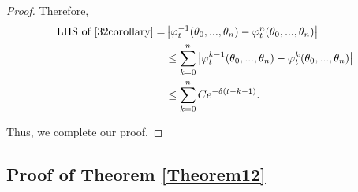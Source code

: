 \documentclass[12pt,oneside,english]{amsart}
\theoremstyle{plain}
\theoremstyle{definition}
\numberwithin{equation}{section}
\begin{document}
\begin{proof}
\begin{comment}
Hence, for any $k\in\{0,...,\lfloor t\rfloor\}$, on the event $\mathcal{A}_{t-k-1}(\epsilon_0)\cap\mathcal{B}_{t-k-1}\cap\mathcal{C}_{t-k-1}$, we get
\begin{align*}
   &\left|\mathbb{\tilde{P}}_{\mu}\left(e^{i\theta \gamma_{t,k}}|\mathscr{F}_{t-k-1}\right)-e^{e^{\alpha}m_k[\theta f]}\right|\\
   &\leq \left|\langle U_1(\tilde{\theta}_{t,k}T_k^{\alpha}f)-\tilde{U}_1(\tilde{\theta}_{t,k}T_k^{\alpha}f), X_{t-k-1}\rangle\right|
   +\left|\langle Z_1(\tilde{\theta}_{t,k}T_k^{\alpha}f),X_{t-k-1}\rangle-e^{\alpha}m_k[\theta f]\right|\\
   &\leq \frac{C}{\mathbb{P}_{\mu}(D^c)}(|\Theta|^{1+2\beta}+|\Theta|^{1+\beta}) e^{-\min\{\frac{\alpha\beta}{4(1+\beta)},\frac{p}{4}\}(t-k-1)}.
\end{align*}
On the event $(\mathcal{A}_{t-k-1}(\epsilon_0)\cap\mathcal{B}_{t-k-1}\cap\mathcal{C}_{t-k-1})^c$, we get
\begin{align*}
    &\left|\mathbb{\tilde{P}}_{\mu}\left(e^{i\theta \gamma_{t,k}}|\mathscr{F}_{t-k-1}\right)-e^{e^{\alpha}m_k[\theta f]}\right|\\
    &\leq 2(\mathbb{\tilde{P}}_{\mu}(\mathcal{A}^c_{t-k-1}(\epsilon_0))+\mathbb{\tilde{P}}_{\mu}(\mathcal{B}^c_{t-k-1})+\mathbb{\tilde{P}}_{\mu}(\mathcal{C}^c_{t-k-1}))\\
    &\leq 6e^{-\min\{\delta_1,\frac{\alpha\beta}{2(1+\beta)},\frac{p}{4}\}(t-k-1)}.
\end{align*}
\end{comment}
Therefore, 
\begin{align}
    \text{LHS of \eqref{32corollary}}= &\left|\varphi^{-1}_t(\theta_0,...,\theta_n)-\varphi^{n}_t(\theta_0,...,\theta_n)\right|
    \\&\leq\sum_{k=0}^n\left|\varphi^{k-1}_t(\theta_0,...,\theta_n)-\varphi^{k}_t(\theta_0,...,\theta_n)\right|
    \\&\leq \sum_{k=0}^n C e^{-\delta(t-k-1)}.
\end{align}

Thus, we complete our proof.
\end{proof}

\subsection{Proof of Theorem \ref{Theorem12}}
\end{document}
